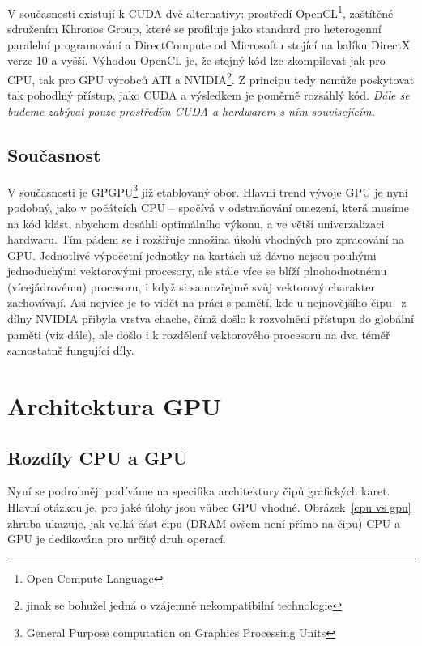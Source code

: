     V současnosti existují k CUDA dvě alternativy: prostředí OpenCL\footnote{Open Compute Language}, zaštítěné sdružením Khronos Group, které se profiluje jako standard pro heterogenní paralelní programování a DirectCompute od Microsoftu stojící na balíku DirectX verze 10 a vyšší. Výhodou OpenCL je, že stejný kód lze zkompilovat jak pro CPU, tak pro GPU výrobců ATI a NVIDIA\footnote{jinak se bohužel jedná o vzájemně nekompatibilní technologie}. Z principu tedy nemůže poskytovat tak pohodlný přístup, jako CUDA a výsledkem je poměrně rozsáhlý kód. \emph{Dále se budeme zabývat pouze prostředím CUDA a hardwarem s ním souvisejícím.}

    \subsection{Současnost}

     V současnosti je GPGPU\footnote{General Purpose computation on Graphics Processing Units} již etablovaný obor. Hlavní trend vývoje GPU je nyní podobný, jako v počátcích CPU -- spočívá v odstraňování omezení, která musíme na kód klást, abychom dosáhli optimálního výkonu, a ve větší univerzalizaci hardwaru. Tím pádem se i rozšiřuje množina úkolů vhodných pro zpracování na GPU. Jednotlivé výpočetní jednotky na kartách už dávno nejsou pouhými jednoduchými vektorovými procesory, ale stále více se blíží plnohodnotnému (vícejádrovému) procesoru, i když si samozřejmě svůj vektorový charakter zachovávají. Asi nejvíce je to vidět na práci s pamětí, kde u nejnovějšího čipu \FERMI ~z dílny NVIDIA přibyla vrstva chache, čímž došlo k rozvolnění přístupu do globální paměti (viz dále), ale došlo i k rozdělení vektorového procesoru na dva téměř samostatně fungující díly.

\section{Architektura GPU}

    \subsection{Rozdíly CPU a GPU}

        Nyní se podrobněji podíváme na specifika architektury čipů grafických karet. Hlavní otázkou je, pro jaké úlohy jsou vůbec GPU vhodné. Obrázek~\ref{cpu vs gpu} zhruba ukazuje, jak velká část čipu (DRAM ovšem není přímo na čipu) CPU a GPU je dedikována pro určitý druh operací.

